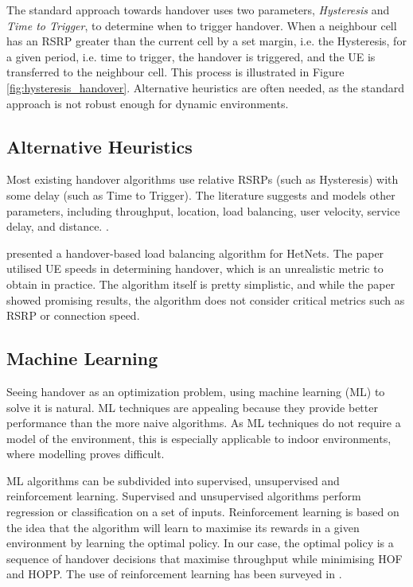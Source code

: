The standard approach towards handover uses two parameters, \textit{Hysteresis} and \textit{Time to Trigger}, to determine when to trigger handover. When a neighbour cell has an RSRP greater than the current cell by a set margin, i.e. the Hysteresis, for a given period, i.e. time to trigger, the handover is triggered, and the UE is transferred to the neighbour cell. This process is illustrated in Figure \ref{fig:hysteresis_handover}. Alternative heuristics are often needed, as the standard approach is not robust enough for dynamic environments.



\clearpage %

\subsection{Alternative Heuristics}
Most existing handover algorithms use relative RSRPs (such as Hysteresis) with some delay (such as Time to Trigger). The literature suggests and models other parameters, including throughput, location, load balancing, user velocity, service delay, and distance. \cite{nyangaresi_efficient_2022}.

\citet{hatipoglu_handover-based_2020} presented a handover-based load balancing algorithm for HetNets. The paper utilised UE speeds in determining handover, which is an unrealistic metric to obtain in practice. The algorithm itself is pretty simplistic, and while the paper showed promising results, the algorithm does not consider critical metrics such as RSRP or connection speed.

\subsection{Machine Learning}
Seeing handover as an optimization problem, using machine learning (ML) to solve it is natural. ML techniques are appealing because they provide better performance than the more naive algorithms. As ML techniques do not require a model of the environment, this is especially applicable to indoor environments, where modelling proves difficult.

ML algorithms can be subdivided into supervised, unsupervised and reinforcement learning. Supervised and unsupervised algorithms perform regression or classification on a set of inputs. Reinforcement learning is based on the idea that the algorithm will learn to maximise its rewards in a given environment by learning the optimal policy. In our case, the optimal policy is a sequence of handover decisions that maximise throughput while minimising HOF and HOPP. The use of reinforcement learning has been surveyed in \cite{mollel_survey_2021}.

